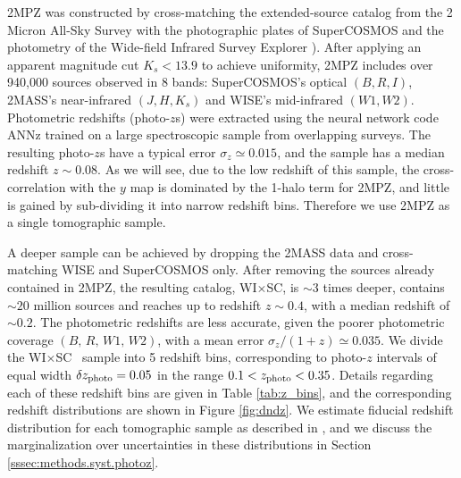 \documentclass[useAMS,usenatbib]{mn2e}
\newcommand{\wisc}{WI$\times$SC}
\begin{document}
    2MPZ was constructed by cross-matching the extended-source catalog from the 2 Micron All-Sky Survey \citep[2MASS,][]{2006AJ....131.1163S,2000AJ....119.2498J} with the photographic plates of SuperCOSMOS \citep{2001MNRAS.326.1295H,2016MNRAS.462.2085P} and the photometry of the Wide-field Infrared Survey Explorer \citep[WISE,][]{2010AJ....140.1868W}). After applying an apparent magnitude cut $K_s<13.9$ to achieve uniformity, 2MPZ includes over 940,000 sources observed in 8 bands: SuperCOSMOS's optical $(B,R,I)$, 2MASS's near-infrared $(J,H,K_s)$ and WISE's mid-infrared $(W1,W2)$. Photometric redshifts (photo-$z$s) were extracted using the neural network code ANNz \citep{2004PASP..116..345C} trained on a large spectroscopic sample from overlapping surveys. The resulting photo-$z$s have a typical error $\sigma_z\simeq0.015$, and the sample has a median redshift $z\sim0.08$. As we will see, due to the low redshift of this sample, the cross-correlation with the $y$ map is dominated by the 1-halo term for 2MPZ, and little is gained by sub-dividing it into narrow redshift bins. Therefore we use 2MPZ as a single tomographic sample.
    
    A deeper sample can be achieved by dropping the 2MASS data and cross-matching WISE and SuperCOSMOS only. After removing the sources already contained in 2MPZ, the resulting catalog, \wisc, is $\sim$3 times deeper, contains $\sim20$ million sources and reaches up to redshift $z\sim0.4$, with a median redshift of $\sim0.2$. The photometric redshifts are less accurate, given the poorer photometric coverage $(B,\,R,\,W1,\,W2)$, with a mean error $\sigma_z/(1+z)\simeq0.035$. We divide the \wisc~ sample into 5 redshift bins, corresponding to photo-$z$ intervals of equal width $\delta z_{\rm photo}=0.05$ in the range $0.1<z_{\rm photo}<0.35$. Details regarding each of these redshift bins are given in Table \ref{tab:z_bins}, and the corresponding redshift distributions are shown in Figure \ref{fig:dndz}. We estimate fiducial redshift distribution for each tomographic sample as described in \cite{2018MNRAS.481.1133P}, and we discuss the marginalization over uncertainties in these distributions in Section \ref{sssec:methods.syst.photoz}.
\end{document}
